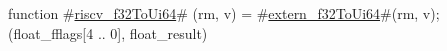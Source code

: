 function #\hyperref[sailRISCVzriscvzyf32ToUi64]{riscv\_f32ToUi64}# (rm, v) = {
  #\hyperref[sailRISCVzexternzyf32ToUi64]{extern\_f32ToUi64}#(rm, v);
  (float_fflags[4 .. 0], float_result)
}
